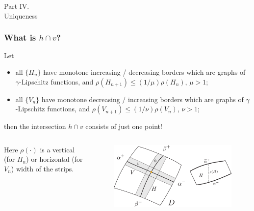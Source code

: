 \documentclass [10pt] {beamer}
\begin{document}
\begin{frame}
	\begin{center}
		{\Huge Part IV.} \\[10pt] {\LARGE Uniqueness}
	\end{center}
\end{frame}

\begin{frame}
	\frametitle{What is $h \cap v$?}
	\begin{theorem}
		Let
		\begin{itemize}
			\item all $\{H_n\}$ have monotone increasing / decreasing borders  which are graphs of $\gamma$-Lipschitz functions, and $\rho(H_{n+1}) \le (1 / \mu) \rho(H_n)$, $\mu > 1$;
			\item all $\{V_n\}$ have monotone decreasing / increasing borders  which are graphs of $\gamma$-Lipschitz functions,  and $\rho(V_{n+1}) \le (1 / \nu) \rho(V_n)$, $\nu > 1$;
		\end{itemize}
 		then the intersection $h \cap v$ consists of just one point!
		\end{theorem}
	\begin{columns}[T]
		\begin{column}{.4\textwidth}
		\begin{center}
			Here $\rho(\cdot)$ is a vertical (for $H_n$) or horizontal (for $V_n$) width of the strips.
		\end{center}
		\end{column}
		\begin{column}{.6\textwidth}
			\begin{figure}
			\includegraphics[width = 1\textwidth]{pic/curves-strips-width.pdf}
			\label{pic:curves-strips-width}
			\end{figure}
		\end{column}
	\end{columns}
\end{frame}
\end{document}
